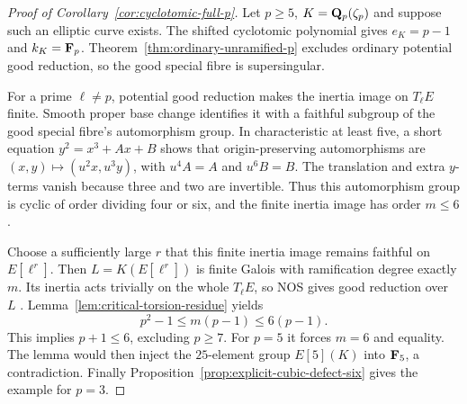 \begin{proof}[Proof of Corollary~\ref{cor:cyclotomic-full-p}]
Let $p\ge5$, $K=\mathbf Q_p(\zeta_p)$ and suppose such an elliptic curve exists. The shifted cyclotomic polynomial gives $e_K=p-1$ and $k_K=\mathbf F_p$. Theorem~\ref{thm:ordinary-unramified-p} excludes ordinary potential good reduction, so the good special fibre is supersingular.

For a prime $\ell\ne p$, potential good reduction makes the inertia image on $T_\ell E$ finite. Smooth proper base change identifies it with a faithful subgroup of the good special fibre's automorphism group. In characteristic at least five, a short equation $y^2=x^3+Ax+B$ shows that origin-preserving automorphisms are $(x,y)\mapsto(u^2x,u^3y)$, with $u^4A=A$ and $u^6B=B$. The translation and extra $y$-terms vanish because three and two are invertible. Thus this automorphism group is cyclic of order dividing four or six, and the finite inertia image has order $m\le6$.

Choose a sufficiently large $r$ that this finite inertia image remains faithful on $E[\ell^r]$. Then $L=K(E[\ell^r])$ is finite Galois with ramification degree exactly $m$. Its inertia acts trivially on the whole $T_\ell E$, so NOS gives good reduction over $L$ \citep[Theorem~1, p.~493]{SerreTate1968}. Lemma~\ref{lem:critical-torsion-residue} yields
\[
                         p^2-1\le m(p-1)\le6(p-1).
\]
This implies $p+1\le6$, excluding $p\ge7$. For $p=5$ it forces $m=6$ and equality. The lemma would then inject the $25$-element group $E[5](K)$ into $\mathbf F_5$, a contradiction. Finally Proposition~\ref{prop:explicit-cubic-defect-six} gives the example for $p=3$.
\end{proof}
